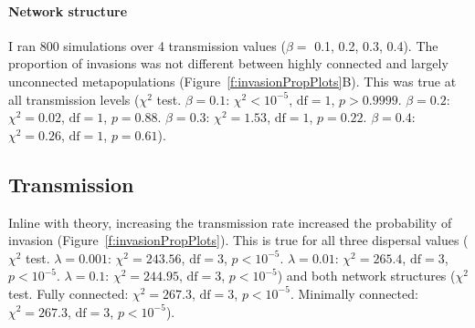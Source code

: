 \paragraph{Network structure}

I ran 800 simulations over 4 transmission values ($\beta = $ 0.1, 0.2, 0.3, 0.4).
The proportion of invasions was not different between highly connected and largely unconnected metapopulations (Figure~\ref{f:invasionPropPlots}B). 
This was true at all transmission levels ($\chi^2$ test. $\beta = 0.1$: $\chi^2 < 10^{-5}$, $\text{df} = 1$, $p > 0.9999$. $\beta = 0.2$: $\chi^2 = 0.02$, $\text{df} = 1$, $p = 0.88$. $\beta = 0.3$: $\chi^2 = 1.53$, $\text{df} = 1$, $p = 0.22$. $\beta = 0.4$: $\chi^2 = 0.26$, $\text{df} = 1$, $p = 0.61$).

 
\subsection{Transmission}

Inline with theory, increasing the transmission rate increased the probability of invasion (Figure~\ref{f:invasionPropPlots}).
This is true for all three dispersal values ($\chi^2$ test. $\lambda = 0.001$: $\chi^2 = 243.56$, $\text{df} = 3$, $p < 10^{-5}$. $\lambda = 0.01$: $\chi^2 = 265.4$, $\text{df} = 3$, $p < 10^{-5}$. $\lambda = 0.1$: $\chi^2 = 244.95$, $\text{df} = 3$, $p < 10^{-5}$) and both network structures ($\chi^2$ test. Fully connected: $\chi^2 = 267.3$, $\text{df} = 3$, $p < 10^{-5}$. Minimally connected: $\chi^2 =  267.3$, $\text{df} = 3$, $p < 10^{-5}$).









